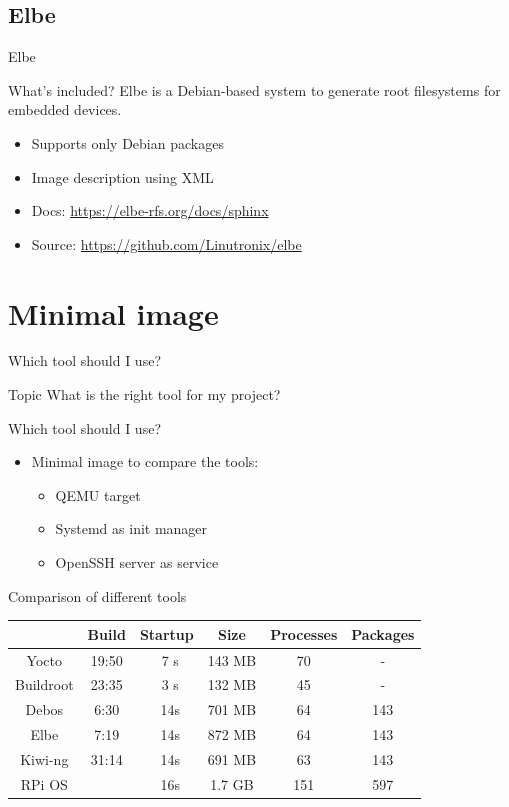 \documentclass{beamer}
\begin{document}
\subsection{Elbe}

\begin{frame}{Elbe}
	\begin{block}{What's included?} 
		Elbe is a Debian-based system to generate root filesystems for embedded devices.
	\end{block}

	\begin{itemize}
		\item Supports only Debian packages
		\item Image description using XML
		\item Docs: \url{https://elbe-rfs.org/docs/sphinx}
		\item Source: \url{https://github.com/Linutronix/elbe}
	\end{itemize}
\end{frame}

\section{Minimal image}

\begin{frame}{Which tool should I use?}
	\begin{block}{Topic}
		What is the right tool for my project?
	\end{block}
\end{frame}

\begin{frame}{Which tool should I use?}
	\begin{itemize}
		\item Minimal image to compare the tools:
		\begin{itemize}
			\item QEMU target
			\item Systemd as init manager
			\item OpenSSH server as service
		\end{itemize}
	\end{itemize}
\end{frame}

\begin{frame}{Comparison of different tools}
	\begin{tabular}{c|ccccc}
		& \textbf{Build} & \textbf{Startup} & \textbf{Size} & \textbf{Processes} & \textbf{Packages} \\
		\hline
		Yocto & 19:50 & ~7 s & 143 MB & 70 & - \\ 
		Buildroot & 23:35 & ~3 s & 132 MB & 45 & - \\
		\hline
		Debos & 6:30 & ~14s & 701 MB & 64 & 143 \\
		Elbe & 7:19 & ~14s & 872 MB & 64 & 143 \\
		Kiwi-ng & 31:14 & ~14s & 691 MB & 63 & 143 \\
		\hline
		RPi OS & & ~16s & 1.7 GB & 151 & 597 \\
	\end{tabular}
\end{frame}
\end{document}
